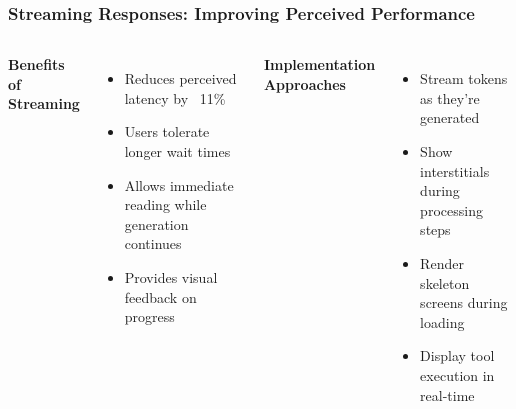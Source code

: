 \begin{frame}
    \frametitle{Streaming Responses: Improving Perceived Performance}
    
    \begin{columns}
        \textbf{Benefits of Streaming}
        \begin{itemize}
            \item Reduces perceived latency by ~11\%
            \item Users tolerate longer wait times
            \item Allows immediate reading while generation continues
            \item Provides visual feedback on progress
        \end{itemize}
        
        \textbf{Implementation Approaches}
        \begin{itemize}
            \item Stream tokens as they're generated
            \item Show interstitials during processing steps
            \item Render skeleton screens during loading
            \item Display tool execution in real-time
        \end{itemize}
    \end{columns}
    
    \begin{center}
    \end{center}
\end{frame}

